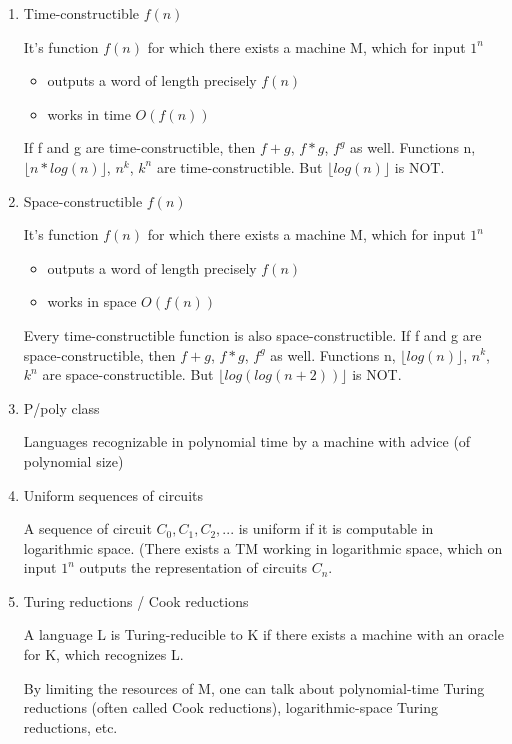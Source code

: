 \begin{enumerate}
    \item Time-constructible $f(n)$
    
    It's function $f(n)$ for which there exists a machine M, which for input $1^n$
    \begin{itemize}
        \item outputs a word of length precisely $f(n)$
        \item works in time $O(f(n))$
    \end{itemize}
    If f and g are time-constructible, then $f+g$, $f*g$, $f^g$ as well. Functions n, $\lfloor n*log(n) \rfloor$, $n^k$, $k^n$ are time-constructible. But $\lfloor log(n) \rfloor$ is NOT.
    
    \item Space-constructible $f(n)$
    
    It's function $f(n)$ for which there exists a machine M, which for input $1^n$
    \begin{itemize}
        \item outputs a word of length precisely $f(n)$
        \item works in space $O(f(n))$
    \end{itemize}
    Every time-constructible function is also space-constructible.
    If f and g are space-constructible, then $f+g$, $f*g$, $f^g$ as well. Functions n, $\lfloor log(n) \rfloor$, $n^k$, $k^n$ are space-constructible. But $\lfloor log(log(n+2)) \rfloor$ is NOT.
    
    \item P/poly class
    
    Languages recognizable in polynomial time by a machine with advice (of polynomial size)
    
    \item Uniform sequences of circuits
    
    A sequence of circuit $C_0, C_1, C_2,...$ is uniform if it is computable in logarithmic space. (There exists a TM working in logarithmic space, which on input $1^n$ outputs the representation of circuits $C_n$.
    
    \item Turing reductions / Cook reductions
    
    A language L is Turing-reducible to K if there exists a machine with an oracle for K, which recognizes L.
    
    By limiting the resources of M, one can talk about polynomial-time Turing reductions (often called Cook reductions), logarithmic-space Turing reductions, etc.
    

\end{enumerate}
